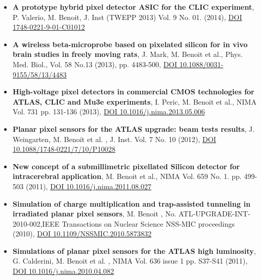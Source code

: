 \begin{itemize}
\item \textbf{A prototype hybrid pixel detector ASIC for the CLIC experiment}, P. Valerio, M. Benoit, J. Inst (TWEPP 2013) Vol. 9 No. 01. (2014), \href{https://iopscience.iop.org/article/10.1088/1748-0221/9/01/C01012/meta}{DOI 1748-0221-9-01-C01012}\\

\item \textbf{A wireless beta-microprobe based on pixelated silicon for in vivo brain studies in freely moving rats}, J. Mark,  M. Benoit et al., Phys. Med. Biol., Vol. 58 No.13 (2013), pp. 4483-500, \href{https://iopscience.iop.org/article/10.1088/0031-9155/58/13/4483/pdf}{DOI 10.1088/0031-9155/58/13/4483}\\

\item \textbf{High-voltage pixel detectors in commercial CMOS technologies for ATLAS, CLIC and Mu3e experiments}, I. Peric, M. Benoit et al., NIMA Vol. 731 pp. 131-136 (2013), \href{https://cds.cern.ch/record/1709928}{DOI 10.1016/j.nima.2013.05.006}\\

\item	\textbf{Planar pixel sensors for the ATLAS upgrade: beam tests results},  J. Weingarten, M. Benoit et al. , J. Inst. Vol. 7 No. 10 (2012), \href{https://iopscience.iop.org/article/10.1088/1748-0221/7/10/P10028}{DOI 10.1088/1748-0221/7/10/P10028}\\

\item \textbf{New concept of a submillimetric pixellated Silicon detector for intracerebral application}, M. Benoit et al., NIMA Vol. 659 No. 1.  pp. 499-503 (2011), \href{https://www.sciencedirect.com/science/article/pii/S0168900211016263}{DOI 10.1016/j.nima.2011.08.027}\\

\item	\textbf{Simulation of charge multiplication and trap-assisted tunneling in irradiated planar pixel sensors}, M. Benoit , No. ATL-UPGRADE-INT-2010-002,IEEE Transactions on Nuclear Science NSS-MIC proceedings (2010), \href{https://ieeexplore.ieee.org/document/5873832}{DOI 10.1109/NSSMIC.2010.5873832}\\

\item	\textbf{Simulations of planar pixel sensors for the ATLAS high luminosity}, G. Calderini, M. Benoit et al. , NIMA Vol. 636 issue 1 pp. S37-S41 (2011), \href{https://cds.cern.ch/record/1999231}{DOI 10.1016/j.nima.2010.04.082}\\


\end{itemize}
